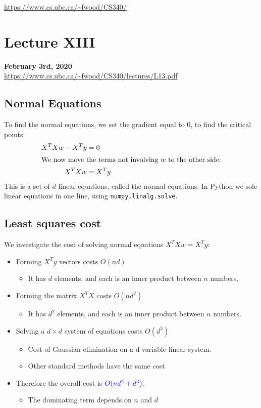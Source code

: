 \documentclass{article}
\def\blu#1{{\color{blu}#1}}
\def\gre#1{{\color{gre}#1}}
\def\red#1{{\color{red}#1}}
\theoremstyle{definition}
\begin{document}
\noindent \url{https://www.cs.ubc.ca/~fwood/CS340/}

\section*{Lecture XIII}
\textbf{February 3rd, 2020} \\
\url{https://www.cs.ubc.ca/~fwood/CS340/lectures/L13.pdf}

\subsection*{Normal Equations}
To find the normal equations, we \gre{set the gradient equal to 0}, to find the critical points:
\begin{align*}
	X^TXw - X^Ty &= 0 \\
	\intertext{We now move the terms not involving $ w $ to the other side:}
	X^TXw &= X^Ty
\end{align*} 
This is a set of $ d $ linear equations, called the \blu{normal equations}. In \blu{Python} we sole linear equations in one line, using \texttt{numpy.linalg.solve}.

\subsection*{Least squares cost}
We investigate the cost of solving normal equations $ X^TXw = X^Ty $:
\begin{itemize}
	\item Forming $ X^Ty $ vectors costs $ O(nd) $
	\begin{itemize}
		\item It has $ d $ elements, and each is an inner product between $ n $ numbers.
	\end{itemize}
\item Forming the matrix $ X^TX $ costs \red{$ O(nd^2) $}
\begin{itemize}
	\item It has $ d^2 $ elements, and each is an inner product between $ n $ numbers.
\end{itemize}
\item Solving a $ d \times d $ system of equations costs \red{$ O(d^3) $}
\begin{itemize}
	\item Cost of Gaussian elimination on a d-variable linear system.
	\item Other standard methods have the same cost
\end{itemize}
\item Therefore the overall cost is $ \blu{O(nd^2 + d^3)} $.
\begin{itemize}
	\item The dominating term depends on $ n $ and $ d $
\end{itemize}
\end{itemize}
\end{document}
